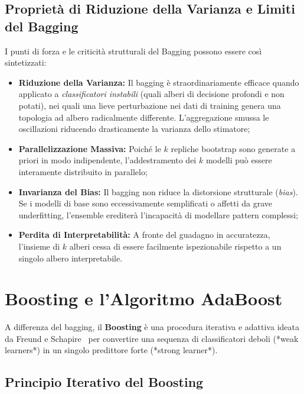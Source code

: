 \FloatBarrier
\subsection{Proprietà di Riduzione della Varianza e Limiti del Bagging}
\label{subsec:dm-bagging-tradeoffs}

I punti di forza e le criticità strutturali del Bagging possono essere così sintetizzati:
\begin{itemize}
    \item \textbf{Riduzione della Varianza:} Il bagging è straordinariamente efficace quando applicato a \textit{classificatori instabili} (quali alberi di decisione profondi e non potati), nei quali una lieve perturbazione nei dati di training genera una topologia ad albero radicalmente differente. L'aggregazione smussa le oscillazioni riducendo drasticamente la varianza dello stimatore;
    \item \textbf{Parallelizzazione Massiva:} Poiché le $k$ repliche bootstrap sono generate a priori in modo indipendente, l'addestramento dei $k$ modelli può essere interamente distribuito in parallelo;
    \item \textbf{Invarianza del Bias:} Il bagging non riduce la distorsione strutturale (\textit{bias}). Se i modelli di base sono eccessivamente semplificati o affetti da grave underfitting, l'ensemble erediterà l'incapacità di modellare pattern complessi;
    \item \textbf{Perdita di Interpretabilità:} A fronte del guadagno in accuratezza, l'insieme di $k$ alberi cessa di essere facilmente ispezionabile rispetto a un singolo albero interpretabile.
\end{itemize}

\FloatBarrier
\section{Boosting e l'Algoritmo AdaBoost}
\label{sec:dm-boosting-adaboost}

A differenza del bagging, il \textbf{Boosting} è una procedura iterativa e adattiva ideata da Freund e Schapire~\cite{freund1997} per convertire una sequenza di classificatori deboli (*weak learners*) in un singolo predittore forte (*strong learner*).

\FloatBarrier
\subsection{Principio Iterativo del Boosting}
\label{subsec:dm-boosting-principles}

